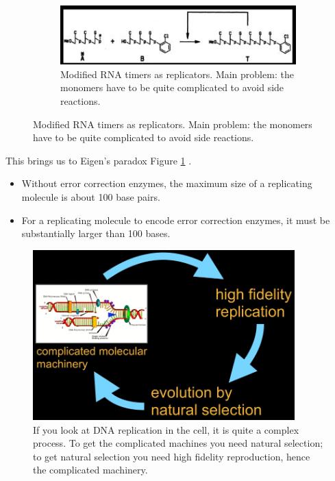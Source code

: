 \documentclass[]{article}
\begin{document}
\begin{figure}[H]
\begin{subfigure}[t]{0.45\textwidth}
	\end{subfigure}
	\;\;
	\begin{subfigure}[t]{0.45\textwidth}
		\caption{Modified RNA timers as replicators\cite{von1986self}. Main problem: the monomers have to be quite complicated to avoid side reactions.}
		\includegraphics[width=\textwidth]{TemplateReplicators4}
	\end{subfigure}
\end{figure}


This brings us to Eigen's paradox Figure \ref{fig:EigensParadox} \cite{eigen1971selforganization} \cite{wiki:error-threshold}.
\begin{itemize}
	\item Without error correction enzymes, the maximum size of a replicating molecule is about 100 base pairs.
	\item For a replicating molecule to encode error correction enzymes, it must be substantially larger than 100 bases.
\end{itemize}

 
\begin{figure}[H]
	\caption[Eigen's Paradox]{If you look at DNA replication in the cell, it is quite a complex process. To get the complicated machines you need natural selection; to get natural selection you need high fidelity reproduction, hence the complicated machinery.}\label{fig:EigensParadox}
	\includegraphics[width=0.9\textwidth]{EigensParadox}
\end{figure}
\end{document}
